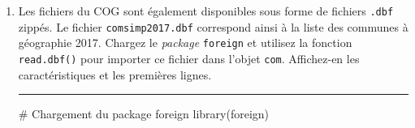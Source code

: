 \documentclass[12pt,twosided, notitlepage]{book}
\newenvironment{Shaded}{}{}
\newcommand{\KeywordTok}[1]{\textcolor[rgb]{0.00,0.00,1.00}{{#1}}}
\newcommand{\CommentTok}[1]{\textcolor[rgb]{0.00,0.50,0.00}{{#1}}}
\newcommand{\NormalTok}[1]{{#1}}
\newif \ifsol
\renewenvironment{Shaded}{\begin{snugshade}}{\end{snugshade}}
\begin{document}
\begin{enumerate}
  \begin{center} \rule{0.5\linewidth}{\linethickness}\end{center}

  \bigskip  \fi 
\item
  Les fichiers du COG sont également disponibles sous forme de fichiers
  \texttt{.dbf} zippés. Le fichier \texttt{comsimp2017.dbf} correspond
  ainsi à la liste des communes à géographie 2017. Chargez le
  \emph{package} \texttt{foreign} et utilisez la fonction
  \texttt{read.dbf()} pour importer ce fichier dans l'objet
  \texttt{com}. Affichez-en les caractéristiques et les premières
  lignes.

  \ifsol 

  \begin{center} \rule{0.5\linewidth}{\linethickness}\end{center}

\begin{Shaded}
\begin{Highlighting}[]
\CommentTok{# Chargement du package foreign}
\KeywordTok{library}\NormalTok{(foreign)}


\end{Highlighting}
\end{Shaded}
\end{enumerate}
\end{document}
